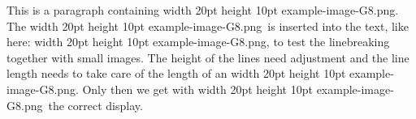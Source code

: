 

\ifhint
\def\img{\HINTimage=example-image-G8.png width 20pt height 10pt\relax}
\else
\def\img{\pdfximage width 20pt height 10pt {example-image-G8.png}\pdfrefximage\pdflastximage}
\fi

This is a paragraph containing \img. The \img\ is inserted into
the text, like here: \img, to test the linebreaking together with
small images. The height of the lines need adjustment and the
line length needs to take care of the length of an \img. Only then
we get with \img\ the correct display.

\vfill
\bye

